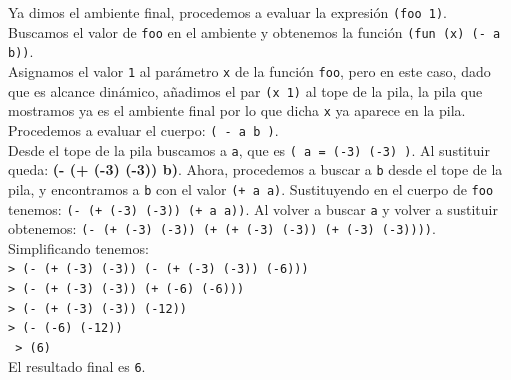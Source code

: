 \documentclass[11pt]{article}
\begin{document}
\begin{enumerate}[leftmargin=0.8cm]
\begin{itemize}
\begin{center}
        \end{center}
        Ya dimos el ambiente final, procedemos a evaluar la expresión \texttt{(foo 1)}.\\
        Buscamos el valor de \texttt{foo} en el ambiente y obtenemos la función \texttt{(fun (x) (- a b))}.\\
        Asignamos el valor \texttt{1} al parámetro \texttt{x} de la función \texttt{foo}, pero en este caso, dado que es alcance dinámico, añadimos el par \texttt{(x 1)} al tope de la pila, la pila que mostramos ya es el ambiente final por lo que dicha \texttt{x} ya aparece en la pila.\\
        Procedemos a evaluar el cuerpo: \texttt{( - a b )}.\\
        Desde el tope de la pila buscamos a \texttt{a}, que es \texttt{( a = (-3) (-3) )}. Al sustituir queda: \textbf{(- (+ (-3) (-3)) b)}. Ahora, procedemos a buscar a \texttt{b} desde el tope de la pila, y encontramos a \texttt{b} con el valor \texttt{(+ a a)}. Sustituyendo en el cuerpo de \texttt{foo} tenemos: \texttt{(- (+ (-3) (-3)) (+ a a))}. Al volver a buscar \texttt{a} y volver a sustituir obtenemos: \texttt{(- (+ (-3) (-3)) (+ (+ (-3) (-3)) (+ (-3) (-3))))}.\\
        Simplificando tenemos:\\ \texttt{> (- (+ (-3) (-3)) (- (+ (-3) (-3)) (-6)))}
        \\ \texttt{> (- (+ (-3) (-3)) (+ (-6) (-6)))}\\
        \texttt{> (- (+ (-3) (-3)) (-12))}
        \\ \texttt{> (- (-6) (-12))}
        \\ \texttt{ > (6)}\\
        El resultado final es \texttt{6}.

    \end{itemize}
\end{enumerate}
\end{document}
